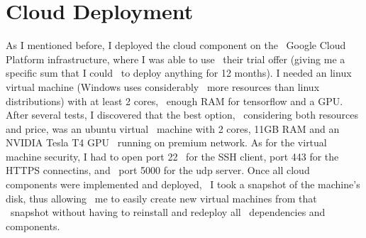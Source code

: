 \section{Cloud Deployment}
\label{sec:implementation-cloud-deployment}
As I mentioned before, I deployed the cloud component on the \
Google Cloud Platform infrastructure, where I was able to use \
their trial offer (giving me a specific sum that I could \
to deploy anything for 12 months).
I needed an linux virtual machine (Windows uses considerably \
more resources than linux distributions) with at least 2 cores, \
enough RAM for tensorflow and a GPU.
After several tests, I discovered that the best option, \
considering both resources and price, was an ubuntu virtual \
machine with 2 cores, 11GB RAM and an NVIDIA Tesla T4 GPU \
running on premium network.
As for the virtual machine security, I had to open port 22 \
for the SSH client, port 443 for the HTTPS connectins, and \
port 5000 for the udp server.
Once all cloud components were implemented and deployed, \
I took a snapshot of the machine's disk, thus allowing \
me to easily create new virtual machines from that \
snapshot without having to reinstall and redeploy all \
dependencies and components.




%
%
